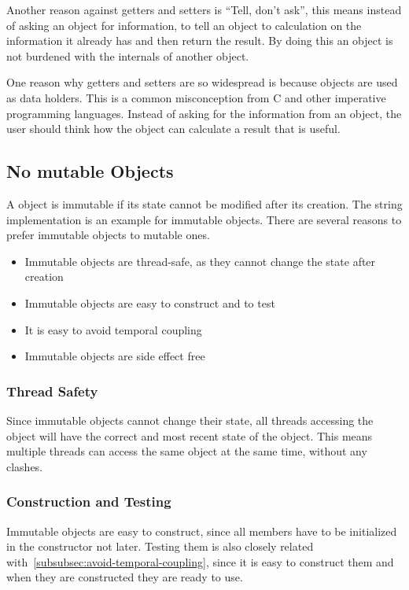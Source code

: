 Another reason against getters and setters is ``Tell, don't ask'', this means instead of asking an object for information, to tell an object to calculation on the information it already has and then return the result.
By doing this an object is not burdened with the internals of another object.\cite{tell-dont-ask}

One reason why getters and setters are so widespread is because objects are used as data holders.
This is a common misconception from C and other imperative programming languages.
Instead of asking for the information from an object, the user should think how the object can calculate a result that is useful.\cite{elegant-objects}

\subsection{No mutable Objects}\label{subsec:no-mutable-objects}
A object is immutable if its state cannot be modified after its creation.
The string implementation is an example for immutable objects.
There are several reasons to prefer immutable objects to mutable ones.\cite{elegant-objects}

\begin{itemize}
    \item Immutable objects are thread-safe, as they cannot change the state after creation
    \item Immutable objects are easy to construct and to test
    \item It is easy to avoid temporal coupling
    \item Immutable objects are side effect free
\end{itemize}

\subsubsection{Thread Safety}
Since immutable objects cannot change their state, all threads accessing the object will have the correct and most recent state of the object.
This means multiple threads can access the same object at the same time, without any clashes.

\subsubsection{Construction and Testing}
Immutable objects are easy to construct, since all members have to be initialized in the constructor not later.
Testing them is also closely related with\ \ref{subsubsec:avoid-temporal-coupling}, since it is easy to construct them and when they are constructed they are ready to use.

